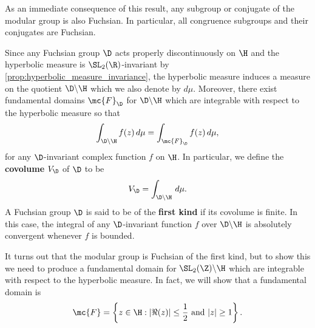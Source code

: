 \documentclass[12pt]{article}
\begin{document}
      As an immediate consequence of this result, any subgroup or conjugate of the modular group is also Fuchsian. In particular, all congruence subgroups and their conjugates are Fuchsian.
      
      Since any Fuchsian group \(\D\) acts properly discontinuously on \(\H\) and the hyperbolic measure is \(\SL_{2}(\R)\)-invariant by \cref{prop:hyperbolic_measure_invariance}, the hyperbolic measure induces a measure on the quotient \(\D\backslash\H\) which we also denote by \(d\mu\). Moreover, there exist fundamental domains \(\mc{F}_{\D}\) for \(\D\backslash\H\) which are integrable with respect to the hyperbolic measure so that
      \[
         \int_{\D\backslash\H}f(z)\,d\mu =  \int_{\mc{F}_{\D}}f(z)\,d\mu,
      \]
      for any \(\D\)-invariant complex function \(f\) on \(\H\). In particular, we define the \textbf{covolume} \(V_{\D}\) of \(\D\) to be
      \[
        V_{\D} = \int_{\D\backslash\H}\,d\mu.
      \]
      A Fuchsian group \(\D\) is said to be of the \textbf{first kind} if its covolume is finite. In this case, the integral of any \(\D\)-invariant function \(f\) over \(\D\backslash\H\) is absolutely convergent whenever \(f\) is bounded.
      
      It turns out that the modular group is Fuchsian of the first kind, but to show this we need to produce a fundamental domain for \(\SL_{2}(\Z)\backslash\H\) which are integrable with respect to the hyperbolic measure. In fact, we will show that a fundamental domain is
      \[
        \mc{F} = \left\{z \in \H:|\Re(z)| \le \frac{1}{2} \text{ and } |z| \ge 1\right\}.
      \]
\end{document}

